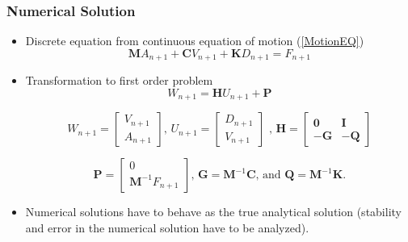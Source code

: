 \documentclass[xcolor=svgnames,9pt]{beamer}
\theoremstyle{remark}
\begin{document}
		\begin{frame}
  			\frametitle{Numerical Solution}
			\begin{itemize}
				\item Discrete equation from continuous equation of motion (\ref{MotionEQ})
				\begin{equation}
					\textbf{M}A_{n+1}+\textbf{C}V_{n+1}+\textbf{K}D_{n+1} =F_{n+1}
				\end{equation}
				\item Transformation to first order problem
				\begin{equation}
					W_{n+1}=\textbf{H}U_{n+1} + \textbf{P}
				\end{equation}

				\begin{equation*}
					W_{n+1}=
					\begin{bmatrix}
						V_{n+1}\\ A_{n+1}
					\end{bmatrix}
					\text{,     } U_{n+1}=
					\begin{bmatrix}
						D_{n+1}\\ V_{n+1}
					\end{bmatrix} 
					\text{     ,     }\textbf{H} = 
					\begin{bmatrix} 
						\textbf{0} & \textbf{I} \\ -\textbf{G} &-\textbf{Q} 
					\end{bmatrix}
				\end{equation*} 

				\begin{equation*} 
					\textbf{P} = 
					\begin{bmatrix}
			 			0\\ \textbf{M}^{-1} F_{n+1}
					\end{bmatrix}
					\text{,     }\textbf{G} = \textbf{M}^{-1}\textbf{C}\text{, and            }\textbf{Q} = \textbf{M}^{-1} \textbf{K}\text{.}
				\end{equation*}
				\item Numerical solutions have to behave as the true analytical solution (stability and error in the numerical solution have to be analyzed).
			\end{itemize}
		\end{frame}
\end{document}
